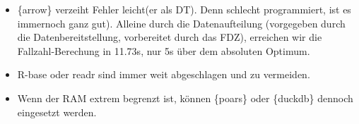 \documentclass[
  german,
  10pt,
  twoside]{article}
\providecommand{\tightlist}{%
  \setlength{\itemsep}{0pt}\setlength{\parskip}{0pt}}
\begin{document}
\begin{itemize}
  \begin{itemize}
  \tightlist
  \item
    5x langsamer als \{arrow\}
  \item
    Variablenauswahl ab einer gewissen Datenmenge erforderlich, da ohne
    3x größer als die Eingangsdaten, dauert 2.2 min anstatt 23 Sec.
    -\textgreater{} schwierige Anwendung (Entscheidung relevanter
    Variablen muss vorab getroffen werden unter Beachtung der
    Arbeitsspeicher Restriktionen)
  \item
    Datenaufteilung verschlechtert DT im Gegensatz zu arrow
  \end{itemize}
\item
  \{arrow\} verzeiht Fehler leicht(er als DT). Denn schlecht
  programmiert, ist es immernoch ganz gut). Alleine durch die
  Datenaufteilung (vorgegeben durch die Datenbereitstellung, vorbereitet
  durch das FDZ), erreichen wir die Fallzahl-Berechung in 11.73s, nur 5s
  über dem absoluten Optimum.
\item
  R-base oder readr sind immer weit abgeschlagen und zu vermeiden.
\item
  Wenn der RAM extrem begrenzt ist, können \{poars\} oder \{duckdb\}
  dennoch eingesetzt werden.
\end{itemize}


\printbibliography
\end{document}
